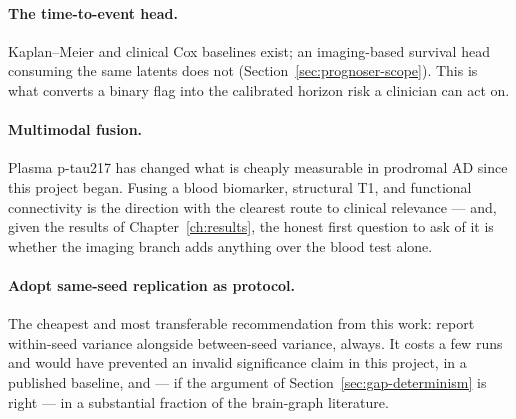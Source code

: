 \paragraph{The time-to-event head.} Kaplan--Meier and clinical Cox baselines exist; an
imaging-based survival head consuming the same latents does not
(Section~\ref{sec:prognoser-scope}). This is what converts a binary flag into the calibrated
horizon risk a clinician can act on.

\paragraph{Multimodal fusion.} Plasma p-tau217 has changed what is cheaply measurable in
prodromal AD since this project began. Fusing a blood biomarker, structural T1, and
functional connectivity is the direction with the clearest route to clinical relevance ---
and, given the results of Chapter~\ref{ch:results}, the honest first question to ask of it
is whether the imaging branch adds anything over the blood test alone.

\paragraph{Adopt same-seed replication as protocol.} The cheapest and most transferable
recommendation from this work: report within-seed variance alongside between-seed variance,
always. It costs a few runs and would have prevented an invalid significance claim in this
project, in a published baseline, and --- if the argument of
Section~\ref{sec:gap-determinism} is right --- in a substantial fraction of the brain-graph
literature.
